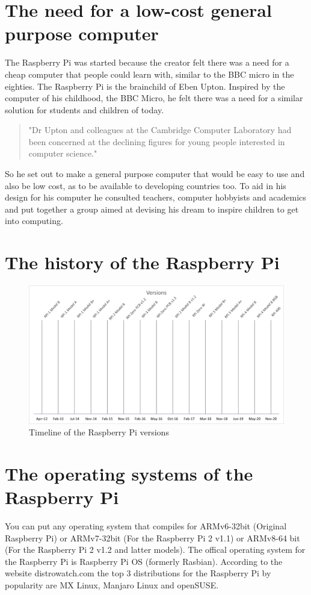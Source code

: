 \documentclass{article}
\begin{document}
    \section{The need for a low-cost general purpose computer}
    The Raspberry Pi was started because the creator felt there was a need for a cheap computer that people could learn with, similar to the BBC micro in the eighties. 
    The Raspberry Pi is the brainchild of Eben Upton. Inspired by the computer of his childhood, the BBC Micro, he felt there was a need for a similar solution for students 
    and children of today.
    \begin{quotation}
     "Dr Upton and colleagues at the Cambridge Computer Laboratory had been concerned at the declining figures for young people interested in computer science."
    \end{quotation} 
    So he set out to make a general purpose computer that would be easy to use and also be low cost, as to be available to developing countries too. To aid in his design for his computer he consulted teachers, computer hobbyists and academics and put together a group aimed at devising his dream to inspire children to get into computing.

    \section{The history of the Raspberry Pi}
    \begin{figure}[ht]
        \centering
        \includegraphics[scale=0.4]{versions.png}
        \caption{Timeline of the Raspberry Pi versions}
        \label{fig:rpiver}
    \end{figure}

    \newpage


    \section{The operating systems of the Raspberry Pi}
    You can put any operating system that compiles for ARMv6-32bit (Original Raspberry Pi) or ARMv7-32bit (For the Raspberry Pi 2 v1.1) or ARMv8-64 bit (For the Raspberry Pi 2 v1.2 and latter models). The offical operating system for the 
    Raspberry Pi is Raspberry Pi OS (formerly Rasbian). According to the website distrowatch.com the top 3 distributions for the Raspberry Pi by popularity are MX Linux, Manjaro Linux 
    and openSUSE.
\end{document}
